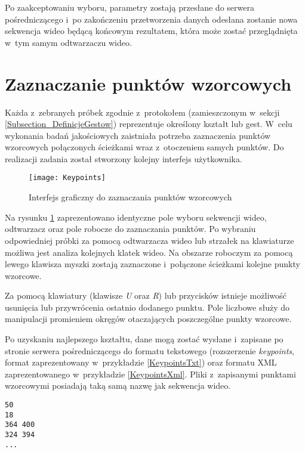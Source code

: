     Po zaakceptowaniu wyboru, parametry zostają przesłane do serwera pośredniczącego i~po zakończeniu przetworzenia danych odesłana zostanie nowa sekwencja wideo będącą końcowym rezultatem, która może zostać przeglądnięta w~tym samym odtwarzaczu wideo.

  \section{Zaznaczanie punktów wzorcowych}\label{Section_Keypoints}

    Każda z~zebranych próbek zgodnie z~protokołem (zamieszczonym w~sekcji \ref{Subsection_DefinicjeGestow}) reprezentuje określony kształt lub gest. W~celu wykonania badań jakościowych zaistniała potrzeba zaznaczenia punktów wzorcowych połączonych ścieżkami wraz z~otoczeniem samych punktów. Do realizacji zadania został stworzony kolejny interfejs użytkownika.

      \begin{figure}[!ht]
        \centering
        \texttt{[image: Keypoints]}
        \caption[Interfejs graficzny do zaznaczania punktów wzorcowych]{Interfejs graficzny do zaznaczania punktów wzorcowych}
        \label{fig:Keypoints}
      \end{figure}

    Na rysunku \ref{fig:Keypoints} zaprezentowano identyczne pole wyboru sekwencji wideo, odtwarzacz oraz pole robocze do zaznaczania punktów. Po wybraniu odpowiedniej próbki za pomocą odtwarzacza wideo lub strzałek na klawiaturze możliwa jest analiza kolejnych klatek wideo. Na obszarze roboczym za pomocą lewego klawisza myszki zostają zaznaczone i~połączone ścieżkami kolejne punkty wzorcowe.

    Za pomocą klawiatury (klawisze \textit{U} oraz \textit{R}) lub przycisków istnieje możliwość usunięcia lub przywrócenia ostatnio dodanego punktu. Pole liczbowe służy do manipulacji promieniem okręgów otaczających poszczególne punkty wzorcowe.

    Po uzyskaniu najlepszego kształtu, dane mogą zostać wysłane i~zapisane po stronie serwera pośredniczącego do formatu tekstowego (rozszerzenie \textit{keypoints}, format zaprezentowany w~przykładzie \ref{KeypointsTxt}) oraz formatu XML zaprezentowanego w~przykładzie \ref{KeypointsXml}. Pliki z~zapisanymi punktami wzorcowymi posiadają taką samą nazwę jak sekwencja wideo.

      \begin{sample}[ht]
        \begin{verbatim}
50
18
364 400
324 394
...
        \end{verbatim}
        \caption{Punkty wzorcowe w~formacie tekstowym (sekwencja \textit{Person\_A\_C})}
        \label{KeypointsTxt}
      \end{sample}

